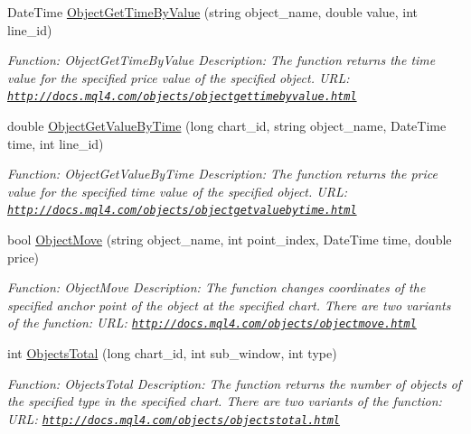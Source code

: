 \begin{DoxyCompactItemize}
Date\+Time \hyperlink{class_m_q_l4_c_sharp_1_1_base_1_1_m_q_l_base_ad4d12fb33c5330daff2fb6cef61d32ad}{Object\+Get\+Time\+By\+Value} (string object\+\_\+name, double value, int line\+\_\+id)
\begin{DoxyCompactList}\small\item\em Function\+: Object\+Get\+Time\+By\+Value Description\+: The function returns the time value for the specified price value of the specified object. U\+RL\+: \href{http://docs.mql4.com/objects/objectgettimebyvalue.html}{\tt http\+://docs.\+mql4.\+com/objects/objectgettimebyvalue.\+html} \end{DoxyCompactList}\item 
double \hyperlink{class_m_q_l4_c_sharp_1_1_base_1_1_m_q_l_base_a77ab5b5530f36f04b0a2fb76300d41dc}{Object\+Get\+Value\+By\+Time} (long chart\+\_\+id, string object\+\_\+name, Date\+Time time, int line\+\_\+id)
\begin{DoxyCompactList}\small\item\em Function\+: Object\+Get\+Value\+By\+Time Description\+: The function returns the price value for the specified time value of the specified object. U\+RL\+: \href{http://docs.mql4.com/objects/objectgetvaluebytime.html}{\tt http\+://docs.\+mql4.\+com/objects/objectgetvaluebytime.\+html} \end{DoxyCompactList}\item 
bool \hyperlink{class_m_q_l4_c_sharp_1_1_base_1_1_m_q_l_base_a4f35e10d784b9f489b9dfa0abbaf72eb}{Object\+Move} (string object\+\_\+name, int point\+\_\+index, Date\+Time time, double price)
\begin{DoxyCompactList}\small\item\em Function\+: Object\+Move Description\+: The function changes coordinates of the specified anchor point of the object at the specified chart. There are two variants of the function\+: U\+RL\+: \href{http://docs.mql4.com/objects/objectmove.html}{\tt http\+://docs.\+mql4.\+com/objects/objectmove.\+html} \end{DoxyCompactList}\item 
int \hyperlink{class_m_q_l4_c_sharp_1_1_base_1_1_m_q_l_base_a6bb6e73cc38966b652da23ef95569a16}{Objects\+Total} (long chart\+\_\+id, int sub\+\_\+window, int type)
\begin{DoxyCompactList}\small\item\em Function\+: Objects\+Total Description\+: The function returns the number of objects of the specified type in the specified chart. There are two variants of the function\+: U\+RL\+: \href{http://docs.mql4.com/objects/objectstotal.html}{\tt http\+://docs.\+mql4.\+com/objects/objectstotal.\+html} \end{DoxyCompactList}\item 

\end{DoxyCompactItemize}
